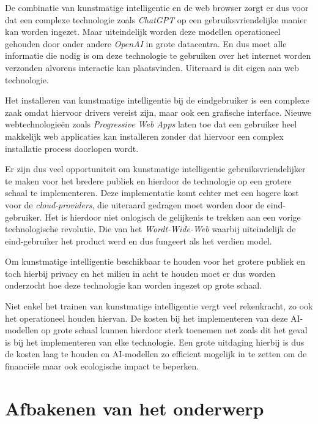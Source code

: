 \bigbreak{}

De combinatie van kunstmatige intelligentie en de web browser zorgt er dus voor dat een complexe technologie zoals \textit{ChatGPT} op een gebruiksvriendelijke manier kan worden ingezet. Maar uiteindelijk worden deze modellen operationeel gehouden door onder andere \textit{OpenAI} in grote datacentra. En dus moet alle informatie die nodig is om deze technologie te gebruiken over het internet worden verzonden alvorens interactie kan plaatsvinden. Uiteraard is dit eigen aan web technologie.

\bigbreak{}

Het installeren van kunstmatige intelligentie bij de eindgebruiker is een complexe zaak omdat hiervoor drivers vereist zijn, maar ook een grafische interface. Nieuwe webtechnologieën zoals \textit{Progressive Web Apps} laten toe dat een gebruiker heel makkelijk web applicaties kan installeren zonder dat hiervoor een complex installatie process doorlopen wordt. 

\break{}

Er zijn dus veel opportuniteit om kunstmatige intelligentie gebruiksvriendelijker te maken voor het bredere publiek en hierdoor de technologie op een grotere schaal te implementeren. Deze implementatie komt echter met een hogere kost voor de \textit{cloud-providers}, die uiteraard gedragen moet worden door de eind-ge\-brui\-ker. Het is hierdoor niet onlogisch de gelijkenis te trekken aan een vorige technologische revolutie. Die van het \textit{Wordt-Wide-Web} waarbij uiteindelijk de eind-gebruiker het product werd en dus fungeert als het verdien model.

\bigbreak{}

Om kunstmatige intelligentie beschikbaar te houden voor het grotere publiek en toch hierbij privacy en het milieu in acht te houden moet er dus worden onderzocht hoe deze technologie kan worden ingezet op grote schaal.

\bigbreak{}

Niet enkel het trainen van kunstmatige intelligentie vergt veel rekenkracht, zo ook het operationeel houden hiervan. De kosten bij het implementeren van deze AI-modellen op grote schaal kunnen hierdoor sterk toenemen net zoals dit het geval is bij het implementeren van elke technologie. Een grote uitdaging hierbij is dus de kosten laag te houden en AI-modellen zo efficient mogelijk in te zetten om de financiële maar ook ecologische impact te beperken.

\section{Afbakenen van het onderwerp}

